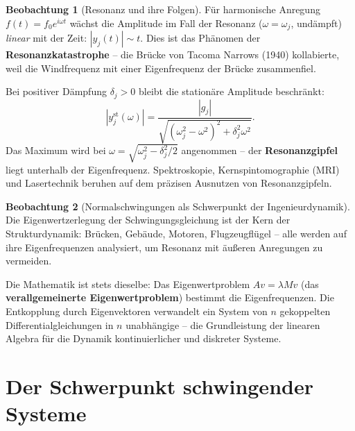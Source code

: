 ﻿\documentclass[a4paper,12pt]{report}
\theoremstyle{definition}
\newtheorem{beobachtung}{Beobachtung}
\begin{document}
\begin{beobachtung}[Resonanz und ihre Folgen]
    Für harmonische Anregung $f(t) = f_0 e^{i\omega t}$ wächst die
    Amplitude im Fall der Resonanz ($\omega = \omega_j$, undämpft)
    \emph{linear} mit der Zeit: $|y_j(t)| \sim t$. Dies ist das
    Phänomen der \textbf{Resonanzkatastrophe} -- die Brücke von Tacoma
    Narrows (1940) kollabierte, weil die Windfrequenz mit einer
    Eigenfrequenz der Brücke zusammenfiel.

    Bei positiver Dämpfung $\delta_j > 0$ bleibt die stationäre
    Amplitude beschränkt:
    \[
        |y_j^\mathrm{st}(\omega)| = \frac{|g_j|}{\sqrt{(\omega_j^2 - \omega^2)^2
        + \delta_j^2 \omega^2}}.
    \]
    Das Maximum wird bei $\omega = \sqrt{\omega_j^2 - \delta_j^2/2}$
    angenommen -- der \textbf{Resonanzgipfel} liegt unterhalb der
    Eigenfrequenz. Spektroskopie, Kernspintomographie (MRI) und
    Lasertechnik beruhen auf dem präzisen Ausnutzen von Resonanzgipfeln.
\end{beobachtung}

\begin{beobachtung}[Normalschwingungen als Schwerpunkt der Ingenieurdynamik]
    Die Eigenwertzerlegung der Schwingungsgleichung ist der Kern der
    Strukturdynamik: Brücken, Gebäude, Motoren, Flugzeugflügel --
    alle werden auf ihre Eigenfrequenzen analysiert, um Resonanz mit
    äußeren Anregungen zu vermeiden.

    Die Mathematik ist stets dieselbe: Das Eigenwertproblem $Av = \lambda Mv$
    (das \textbf{verallgemeinerte Eigenwertproblem}) bestimmt die
    Eigenfrequenzen. Die Entkopplung durch Eigenvektoren verwandelt
    ein System von $n$ gekoppelten Differentialgleichungen in $n$
    unabhängige -- die Grundleistung der linearen Algebra für die
    Dynamik kontinuierlicher und diskreter Systeme.
\end{beobachtung}


\section{Der Schwerpunkt schwingender Systeme}
\end{document}
